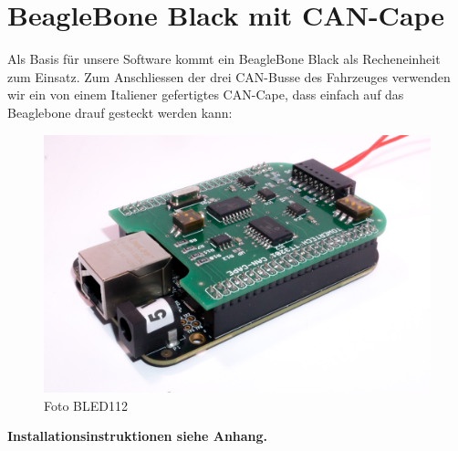 \section{BeagleBone Black mit CAN-Cape}
Als Basis für unsere Software kommt ein BeagleBone Black als Recheneinheit zum Einsatz. Zum Anschliessen der drei CAN-Busse des Fahrzeuges verwenden wir ein von einem Italiener gefertigtes CAN-Cape, dass einfach auf das Beaglebone drauf gesteckt werden kann:

\begin{figure}[hbtp]
	\center
	\includegraphics[width=\textwidth]{bilder/foto-4.jpg}
	\caption{Foto BLED112}
	\label{fig:bled112}
\end{figure}

\textbf{Installationsinstruktionen siehe Anhang.}

